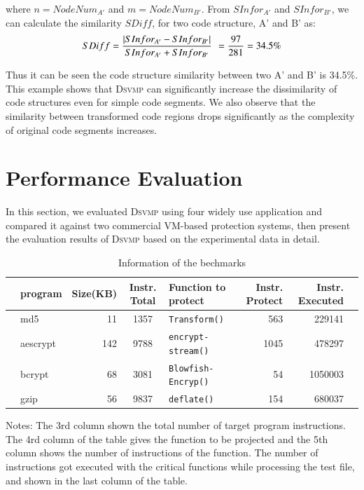 \documentclass[preprint,12pt,3p]{elsarticle}
\newcommand{\DSVMP}{\textsc{Dsvmp}\xspace}
\begin{document}
where $n=NodeNu{m_{A'}}$ and $m=NodeNu{m_{B'}}$.
From $SInfo{r_{A'}}$ and $SInfo{r_{B'}}$,
we can calculate the similarity $SDiff$, for two code structure, A' and B' as:
\begin{align*}
SDiff = \frac{{|SInfo{r_{A'}} - SInfo{r_{B'}}|}}{{SInfo{r_{A'}} + SInfo{r_{B'}}}}\;{\kern 1pt}  = \frac{{97}}{{281}} = 34.5\% \end{align*}

Thus it can be seen the code structure similarity between two A' and B' is  34.5\%.
This example shows that \DSVMP can significantly increase the dissimilarity of code structures even for simple code segments.
We also observe that the similarity between transformed code regions drops significantly
as the complexity of original code segments increases.


\section{Performance Evaluation}\label{sec:p-eva}
In this section, we evaluated \DSVMP using four widely use application
and compared it against two commercial VM-based protection systems,
then present the evaluation results of \DSVMP based on the experimental data in detail.

\begin{table}[!h]
\scriptsize
\begin{center}
\caption{Information of the bechmarks\label{tab:Tab.3}}
{\begin{tabular}{@{}rlrclrrl@{}}\hline
   & \textbf{program} & \textbf{Size(KB)} & \textbf{Instr. Total} & \textbf{Function to protect} & \textbf{Instr. Protect} & \textbf{Instr. Executed} & \\
  \hline
   & md5 & 11 & 1357 & \texttt{Transform()} & 563 & 229141 & \\
   & aescrypt & 142 & 9788 &\texttt{encrypt-stream()} & 1045 & 478297 & \\
   & bcrypt & 68 & 3081 & \texttt{Blowfish-Encryp()} & 54 & 1050003 & \\
   & gzip & 56 & 9837 & \texttt{deflate()} & 154 & 680037 & \\
  \hline
\end{tabular}}{}
\end{center}
Notes: The 3rd column shown the total number of target program instructions. The 4rd column of the table gives the function to be projected and the 5th column shows the number of instructions of the function. The number of instructions got executed with the critical functions while processing the test file, and shown in the last column of the table.
\end{table}
\end{document}
